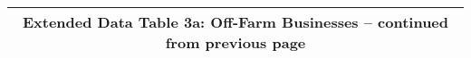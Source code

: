 \begin{longtable}{llcccccccccc}
\multicolumn{12}{c}{{\bfseries Extended Data Table 3a: Off-Farm Businesses -- continued from previous page}} \\ \hline                                                                                                                                                                                                                                                                                                                                                                                                                                                                                                                                                                                                                                                                                                                                                                                            

\end{longtable}
